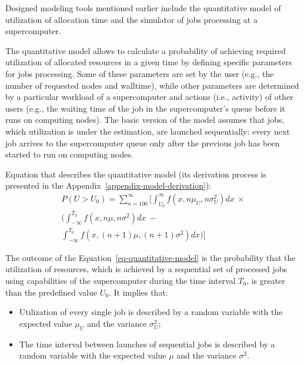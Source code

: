 Designed modeling tools mentioned earlier include the quantitative model of
utilization of allocation time and the simulator of jobs processing at a
supercomputer.

The quantitative model allows to calculate a probability of achieving
required utilization of allocated resources in a given time by defining
specific parameters for jobs processing. Some of these parameters are set by
the user (e.g., the number of requested nodes and walltime), while other
parameters are determined by a particular workload of a supercomputer and
actions (i.e., activity) of other users (e.g., the waiting time of the job
in the supercomputer's queue before it runs on computing nodes). The basic
version of the model assumes that jobs, which utilization is under the
estimation, are launched sequentially: every next job arrives to the
supercomputer queue only after the previous job has been started to run on
computing nodes.

Equation that describes the quantitative model (its derivation process is
presented in the Appendix~\ref{appendix-model-derivation}):
\begin{equation}
    \label{eq-quantitative-model}
    \begin{multlined}
    P(U > U_0) = \sum\limits_{n=100}^{\infty} 
                 \bigg[
                 \int_{U_0}^{\infty}f(x, n\mu_{U}, n\sigma_{U}^2)dx \
                 \times \\
                 \bigg( \int_{-\infty}^{T_0}f(x, n\mu, n\sigma^2)dx \  - \\
                 \int_{-\infty}^{T_0}f(x, (n+1)\mu, (n+1)\sigma^2)dx \bigg)
                 \bigg]
    \end{multlined}
\end{equation}

The outcome of the Equation~\ref{eq-quantitative-model} is the probability
that the utilization of resources, which is achieved by a sequential set of
processed jobs using capabilities of the supercomputer during the time
interval $T_0$, is greater than the predefined value $U_0$. It implies that:
\begin{itemize}
    \item Utilization of every single job is described by a random variable
    with the expected value $\mu_{U}$ and the variance $\sigma_{U}^2$;
    \item The time interval between launches of sequential jobs is described
    by a random variable with the expected value $\mu$ and the
    variance $\sigma^2$.
\end{itemize}


